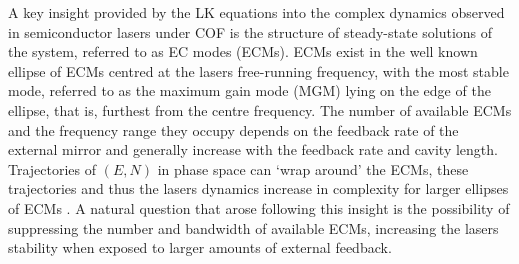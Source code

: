 A key insight provided by the LK equations into the complex dynamics observed in semiconductor lasers under COF is the structure of steady-state solutions of the system, referred to as EC modes (ECMs). ECMs exist in the well known ellipse of ECMs centred at the lasers free-running frequency, with the most stable mode, referred to as the maximum gain mode (MGM) lying on the edge of the ellipse, that is, furthest from the centre frequency. The number of available ECMs and the frequency range they occupy depends on the feedback rate of the external mirror and generally increase with the feedback rate and cavity length. Trajectories of $(E,N)$ in phase space can `wrap around' the ECMs, these trajectories and thus the lasers dynamics increase in complexity for larger ellipses of ECMs \cite{heil2003delay}. A natural question that arose following this insight is the possibility of suppressing the number and bandwidth of available ECMs, increasing the lasers stability when exposed to larger amounts of external feedback.
%
%
